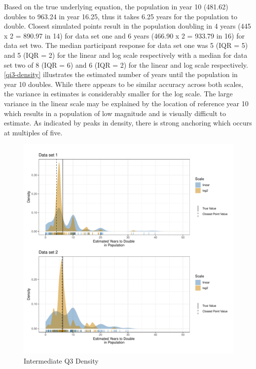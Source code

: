 \documentclass[print]{nuthesis}
\begin{document}
Based on the true underlying equation, the population in year 10 (481.62) doubles to 963.24 in year 16.25, thus it takes 6.25 years for the population to double.
Closest simulated points result in the population doubling in 4 years (445 x 2 = 890.97 in 14) for data set one and 6 years (466.90 x 2 = 933.79 in 16) for data set two.
The median participant response for data set one was 5 (IQR = 5) and 5 (IQR = 2) for the linear and log scale respectively with a median for data set two of 8 (IQR = 6) and 6 (IQR = 2) for the linear and log scale respectively.
\cref{qi3-density} illustrates the estimated number of years until the population in year 10 doubles.
While there appears to be similar accuracy across both scales, the variance in estimates is considerably smaller for the log scale.
The large variance in the linear scale may be explained by the location of reference year 10 which results in a population of low magnitude and is visually difficult to estimate.
As indicated by peaks in density, there is strong anchoring which occurs at multiples of five.

\begin{figure}[tbp]

{\centering \includegraphics[width=1\linewidth,]{thesis_files/figure-latex/qi3-density-1} 

}

\caption{Intermediate Q3 Density}\label{fig:qi3-density}
\end{figure}
\end{document}
